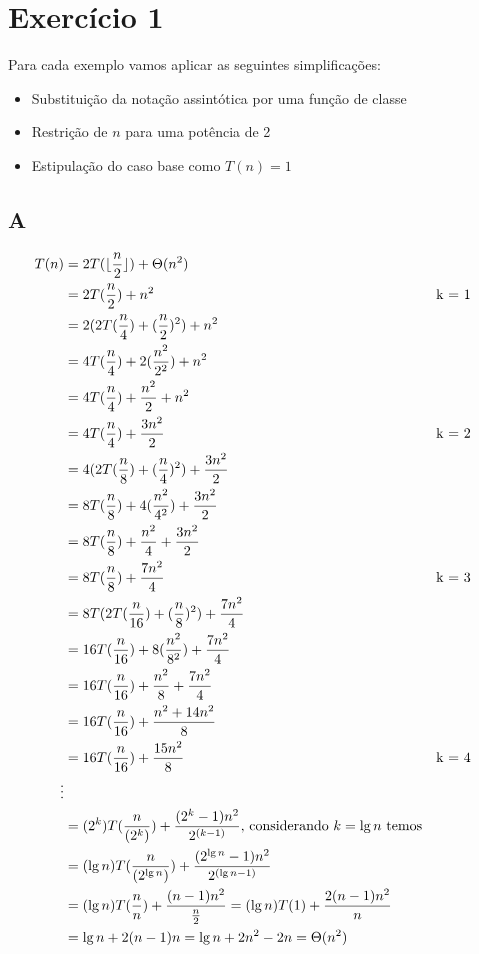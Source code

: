 \section*{Exercício 1}
Para cada exemplo vamos aplicar as seguintes simplificações:
\begin{itemize}
  \item{Substituição da notação assintótica por uma função de classe}
  \item{Restrição de $n$ para uma potência de 2}
  \item{Estipulação do caso base como $T(n) = 1$}
\end{itemize}
\subsection*{A}
\begin{equation}
  \begin{aligned}
      T(n) &= 2T(\lfloor\frac{n}{2}\rfloor) + \Theta(n^2) \\
    &= 2T(\frac{n}{2}) + n^2  && \text{k = 1}\\
    &= 2(2T(\frac{n}{4}) + (\frac{n}{2})^2) + n^2\\
    &= 4T(\frac{n}{4}) + 2(\frac{n^2}{2^2}) + n^2 \\
    &= 4T(\frac{n}{4}) + \frac{n^2}{2} + n^2 \\
    &= 4T(\frac{n}{4}) + \frac{3n^2}{2}  && \text{k = 2}\\
    &= 4(2T(\frac{n}{8}) + (\frac{n}{4})^2) + \frac{3n^2}{2}\\
    &= 8T(\frac{n}{8}) + 4(\frac{n^2}{4^2}) + \frac{3n^2}{2} \\
    &= 8T(\frac{n}{8}) + \frac{n^2}{4} + \frac{3n^2}{2} \\
    &= 8T(\frac{n}{8}) + \frac{7n^2}{4}  && \text{k = 3}\\
    &= 8T(2T(\frac{n}{16}) + (\frac{n}{8})^2) + \frac{7n^2}{4}\\
    &= 16T(\frac{n}{16}) + 8(\frac{n^2}{8^2}) + \frac{7n^2}{4}\\
    &= 16T(\frac{n}{16}) + \frac{n^2}{8} + \frac{7n^2}{4}\\
    &= 16T(\frac{n}{16}) + \frac{n^2 + 14n^2}{8}\\
    &= 16T(\frac{n}{16}) + \frac{15n^2}{8} && \text{k = 4}\\
    \vdots \\
    &= (2^k)T(\frac{n}{(2^k)}) + \frac{(2^k - 1)n^2}{2^{(k-1)}} \text{, considerando $k = \lg n$ temos} \\
    &= (\lg n)T(\frac{n}{(2^{\lg n})}) + \frac{(2^{\lg n} - 1)n^2}{2^{(\lg n - 1)}} \\
    &= (\lg n)T(\frac{n}{n}) + \frac{(n - 1)n^2}{\frac{n}{2}} = (\lg n)T(1) + \frac{2(n - 1)n^2}{n}\\
    &= \lg n + 2(n - 1)n = \lg n + 2n^2 - 2n = \Theta (n^2)\\
  \end{aligned}
\end{equation}
\newpage
